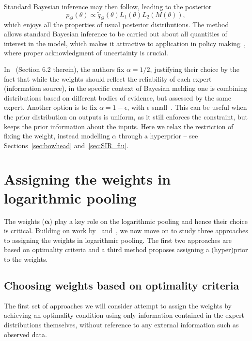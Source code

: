 \documentclass[a4paper, notitlepage, 11pt]{article}
\begin{document}
Standard Bayesian inference may then follow,  leading to the posterior
\begin{equation}
 \label{eq:BMpoolposterior}
 p_{\Theta}(\theta) \propto \tilde{q}_{\Theta}(\theta) L_1(\theta) L_2(M(\theta)),
\end{equation}
which enjoys all the properties of usual posterior distributions.
The method allows standard Bayesian inference to be carried out about all quantities of interest in the model, which makes it attractive to application in policy making~\citep{Alkema2008}, where proper acknowledgment of uncertainty is crucial.

In~\cite{Poole2000} (Section 6.2 therein), the authors fix $\alpha = 1/2$, justifying their choice by the fact that while the weights should reflect the reliability of each expert (information source), in the specific context of Bayesian melding one is combining distributions based on different bodies of evidence, but assessed by the same expert.
Another option is to fix $\alpha = 1-\epsilon$, with $\epsilon$ small~\citep{Alkema2007}.
This can be useful when the prior distribution on outputs is uniform, as it still enforces the constraint, but keeps the prior information about the inputs.
Here we relax the restriction of fixing the weight, instead modelling $\alpha$ through a hyperprior -- see Sections~\ref{sec:bowhead} and~\ref{sec:SIR_flu}. 

\section{Assigning the weights in logarithmic pooling}
\label{sec:weights}

The weights ($\boldsymbol \alpha$) play a key role on the logarithmic pooling and hence their choice is critical.
Building on work by~\cite{Poole2000,Rufo2012A,Rufo2012B} and~\cite{Abbas2009}, we now move on to study three approaches to assigning the weights in logarithmic pooling.
The first two approaches are based on optimality criteria and a third method proposes assigning a (hyper)prior to the weights.

\subsection{Choosing weights based on optimality criteria}

The first set of approaches we will consider attempt to assign the weights by achieving an optimality condition using only information contained in the expert distributions themselves, without reference to any external information such as observed data.
\end{document}
